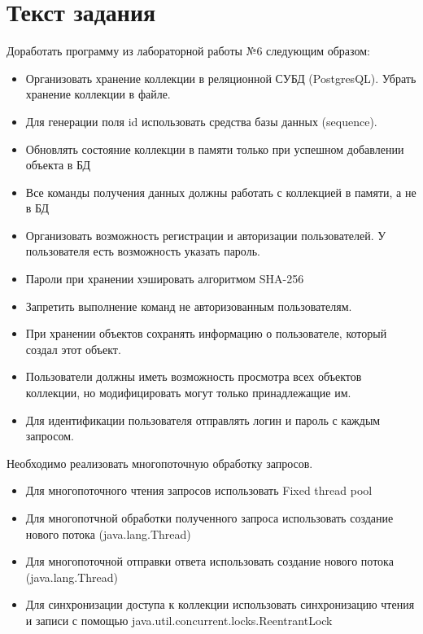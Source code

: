 \section{Текст задания}

Доработать программу из лабораторной работы №6 следующим образом:
\begin{itemize}
  \item Организовать хранение коллекции в реляционной СУБД (PostgresQL). Убрать хранение коллекции в файле.
  \item Для генерации поля id использовать средства базы данных (sequence).
  \item Обновлять состояние коллекции в памяти только при успешном добавлении объекта в БД
  \item Все команды получения данных должны работать с коллекцией в памяти, а не в БД
  \item Организовать возможность регистрации и авторизации пользователей. У пользователя есть возможность указать пароль.
  \item Пароли при хранении хэшировать алгоритмом SHA-256
  \item Запретить выполнение команд не авторизованным пользователям.
  \item При хранении объектов сохранять информацию о пользователе, который создал этот объект.
  \item Пользователи должны иметь возможность просмотра всех объектов коллекции, но модифицировать могут только принадлежащие им.
  \item Для идентификации пользователя отправлять логин и пароль с каждым запросом.
\end{itemize}

Необходимо реализовать многопоточную обработку запросов.

\begin{itemize}
  \item Для многопоточного чтения запросов использовать Fixed thread pool
  \item Для многопотчной обработки полученного запроса использовать создание нового потока (java.lang.Thread)
  \item Для многопоточной отправки ответа использовать создание нового потока (java.lang.Thread)
  \item Для синхронизации доступа к коллекции использовать синхронизацию чтения и записи с помощью java.util.concurrent.locks.ReentrantLock
\end{itemize}
